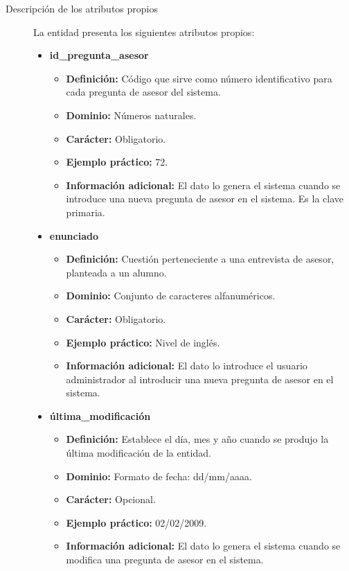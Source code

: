 \begin{description}
   \item[Descripción de los atributos propios] La entidad presenta los siguientes
   atributos propios:

   \begin{itemize}
    \item \textbf{id\_pregunta\_asesor}
      \begin{itemize}
         \item \textbf{Definición:} Código que sirve como número identificativo
               para cada pregunta de asesor del sistema.
         \item \textbf{Dominio:} Números naturales.
         \item \textbf{Carácter:} Obligatorio.
         \item \textbf{Ejemplo práctico:} 72.
         \item \textbf{Información adicional:} El dato lo genera el sistema
               cuando se introduce una nueva pregunta de asesor en el sistema.
               Es la clave primaria.
      \end{itemize}
   \item \textbf{enunciado}
      \begin{itemize}
         \item \textbf{Definición:} Cuestión perteneciente a una entrevista
         de asesor, planteada a un alumno.
         \item \textbf{Dominio:} Conjunto de caracteres alfanuméricos.
         \item \textbf{Carácter:} Obligatorio.
         \item \textbf{Ejemplo práctico:} Nivel de inglés.
         \item \textbf{Información adicional:} El dato lo introduce el
         usuario administrador al introducir una nueva pregunta de asesor en
         el sistema.
      \end{itemize}
    \item \textbf{última\_modificación}
      \begin{itemize}
         \item \textbf{Definición:} Establece el día, mes y año cuando se
            produjo la última modificación de la entidad.
         \item \textbf{Dominio:} Formato de fecha: dd/mm/aaaa.
         \item \textbf{Carácter:} Opcional.
         \item \textbf{Ejemplo práctico:} 02/02/2009.
         \item \textbf{Información adicional:} El dato lo genera el sistema
               cuando se modifica una pregunta de asesor en el sistema.
      \end{itemize}
   \end{itemize}


\end{description}
